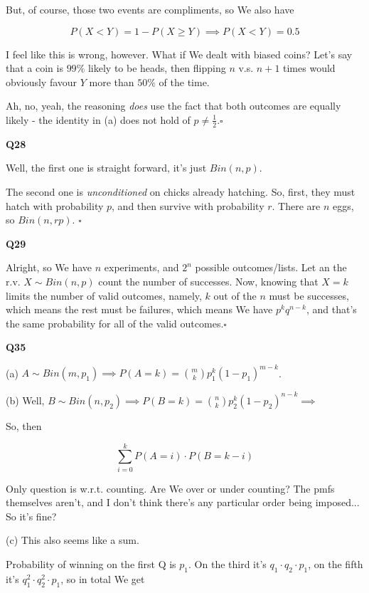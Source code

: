 \documentclass{article}
\newcommand{\qed}{\hfill$\square$}
\begin{document}
			But, of course, those two events are compliments, so We also have
			
			$$P(X<Y) =1 - P(X \ge Y) \implies P(X<Y) = 0.5$$
			
			I feel like this is wrong, however. What if We dealt with biased coins? Let's say that a coin is $99\%$ likely to be heads, then flipping $n$ v.s. $n+1$ times would obviously favour $Y$ more than $50\%$ of the time. 
			
			Ah, no, yeah, the reasoning \textit{does} use the fact that both outcomes are equally likely - the identity in (a) does not hold of $p \neq \frac{1}{2}$.\qed
			
			\hfill
		
		\textbf{Q28}
		
			Well, the first one is straight forward, it's just $Bin(n, p)$.
			
			The second one is \textit{unconditioned} on chicks already hatching. So, first, they must hatch with probability $p$, and then survive with probability $r$. There are $n$ eggs, so $Bin(n, rp)$. \qed
			
			\hfill
			
		\textbf{Q29}
		
			Alright, so We have $n$ experiments, and $2^n$ possible outcomes/lists. Let an the r.v. $X \sim Bin(n, p)$ count the number of successes. Now, knowing that $X=k$ limits the number of valid outcomes, namely, $k$ out of the $n$ must be successes, which means the rest must be failures, which means We have $p^kq^{n-k}$, and that's the same probability for all of the valid outcomes.\qed
			
			\hfill
			
		\textbf{Q35}
		
			(a) $A \sim Bin(m, p_1) \implies P(A = k) = {m \choose k} p_1^k(1-p_1)^{m-k}$.
			
			(b) Well, $B \sim Bin(n, p_2) \implies P(B = k) = {n \choose k} p_2^k(1-p_2)^{n-k} \implies$
			
			So, then
			
			$$\sum^k_{i = 0} P(A = i)\cdot P(B = k-i)$$
			
			Only question is w.r.t. counting. Are We over or under counting? The pmfs themselves aren't, and I don't think there's any particular order being imposed... So it's fine?
			
			(c) This also seems like a sum.
			
			Probability of winning on the first Q is $p_1$. On the third it's $q_1\cdot q_2\cdot p_1$, on the fifth it's $q_1^2\cdot q_2^2\cdot p_1$, so in total We get
			
\end{document}
